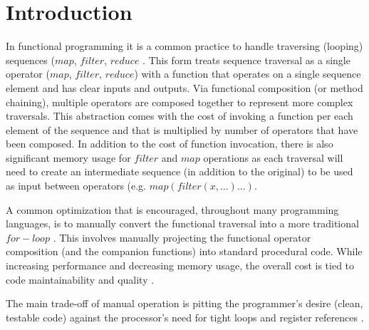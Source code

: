 \chapter{Introduction}
In functional programming it is a common practice to handle traversing (looping) sequences ($map$, $filter$, $reduce$ \cite{TODO}. This form treats sequence traversal as a single operator ($map$, $filter$, $reduce$) with a function that operates on a single sequence element and has clear inputs and outputs.  Via functional composition (or method chaining), multiple operators are composed together to represent more complex traversals.  This abstraction comes with the cost of invoking a function per each element of the sequence and that is multiplied by number of operators that have been composed. In addition to the cost of function invocation, there is also significant memory usage for $filter$ and $map$ operations as each traversal will need to create an intermediate sequence (in addition to the original) to be used as input between operators (e.g. $map(filter(x, ...)...)$.  

A common optimization that is encouraged, throughout many programming languages, is to manually convert the functional traversal into a more traditional $for-loop$ \cite{TODO}.  This involves manually projecting the functional operator composition (and the companion functions) into standard procedural code.  While increasing performance and decreasing memory usage, the overall cost is tied to code maintainability and quality \cite{TODO}.  

The main trade-off of manual operation is pitting the programmer's desire (clean, testable code) against the processor's need for tight loops and register references \cite{TODO}.  